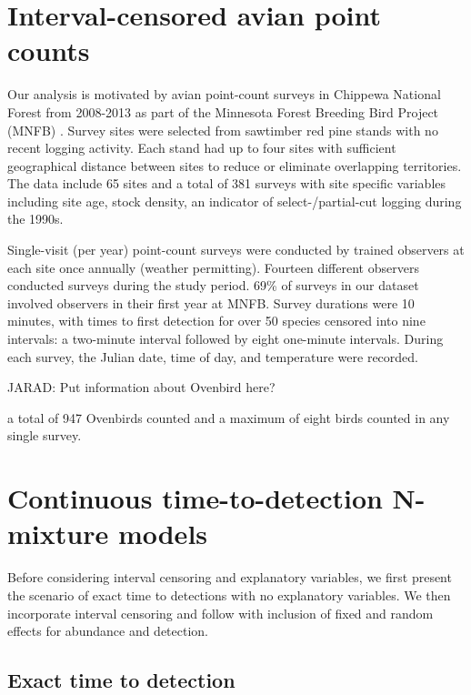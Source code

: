 \documentclass[useAMS,usenatbib,referee,12pt]{article}
\newcommand{\jarad}[1]{{\color{Orange} JARAD: #1}}
\begin{document}
\section{Interval-censored avian point counts}\label{sec:data}

Our analysis is motivated by avian point-count surveys in Chippewa National Forest from 2008-2013 as part of the Minnesota Forest Breeding Bird Project (MNFB) \citep{Hanowski1995}.  
Survey sites were selected from sawtimber red pine stands with no recent logging activity.  
Each stand had up to four sites with sufficient geographical distance between sites to reduce or eliminate overlapping territories.
The data include 65 sites and a total of 381 surveys with site specific variables including site age,  stock density, an indicator of select-/partial-cut logging during the 1990s. 

Single-visit (per year) point-count surveys were conducted by trained observers at each site once annually (weather permitting).  
Fourteen different observers conducted surveys during the study period.  
69\% of surveys in our dataset involved observers in their first year at MNFB.  
Survey durations were 10 minutes, with times to first detection for over 50 species censored into nine intervals: a two-minute interval followed by eight one-minute intervals.  
During each survey, the Julian date, time of day, and temperature were recorded. 

\jarad{Put information about Ovenbird here?}

a total of 947 Ovenbirds counted and a maximum of eight birds counted in any single survey.






\section{Continuous time-to-detection N-mixture models} \label{sec:model}

Before considering interval censoring and explanatory variables, we first present the scenario of exact time to detections with no explanatory variables. 
We then incorporate interval censoring and follow with inclusion of fixed and random effects for abundance and detection. 

\subsection{Exact time to detection}
\end{document}
